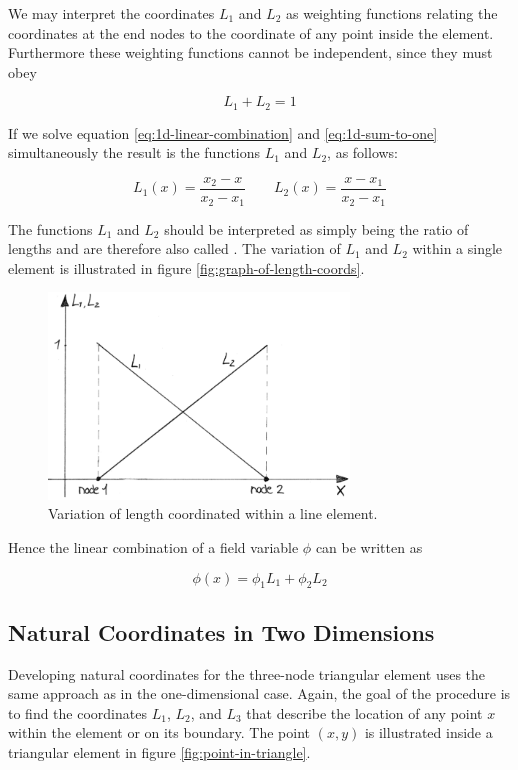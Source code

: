 We may interpret the coordinates $L_1$ and $L_2$ as weighting
functions relating the coordinates at the end nodes to the coordinate
of any point inside the element. Furthermore these weighting functions
cannot be independent, since they must obey

\begin{equation}
\label{eq:1d-sum-to-one}
L_1 + L_2 = 1
\end{equation}

If we solve equation \eqref{eq:1d-linear-combination} and
\eqref{eq:1d-sum-to-one} simultaneously the result is the functions
$L_1$ and $L_2$, as follows:

\begin{equation}
L_1(x) = \frac{x_2 - x}{x_2 - x_1} \qquad L_2(x) = \frac{x - x_1}{x_2 - x_1}
\end{equation}

The functions $L_1$ and $L_2$ should be interpreted as simply being
the ratio of lengths and are therefore also called . The variation of $L_1$ and $L_2$ within a single
element is illustrated in figure \vref{fig:graph-of-length-coords}.

\begin{figure}
  \centering
  \includegraphics[width=8cm]{./images/finite_element_method_graph_of_length_coords.png}
\caption{Variation of length coordinated within a line element.}
\label{fig:graph-of-length-coords}
\end{figure}

Hence the linear combination of a field variable $\phi$ can be written as

\begin{equation}
\phi(x) = \phi_1 L_1 + \phi_2 L_2
\end{equation}

\subsection{Natural Coordinates in Two Dimensions}
Developing natural coordinates for the three-node triangular element
uses the same approach as in the one-dimensional
case. Again, the goal of the procedure is to find the coordinates
$L_1$, $L_2$, and $L_3$ that describe the location of any point $x$
within the element or on its boundary. The point $(x,y)$ is illustrated
inside a triangular element in figure \vref{fig:point-in-triangle}.

